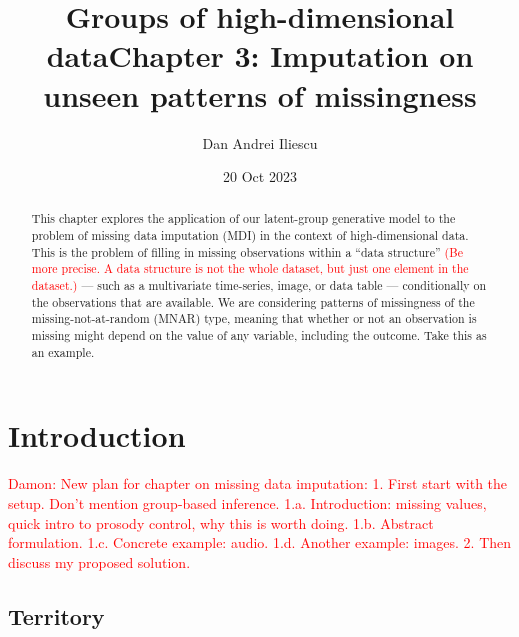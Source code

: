 \documentclass[a4paper,12pt,twoside,openright]{article}
\title{\bf Groups of high-dimensional data}
\author{Dan Andrei Iliescu}
\date{20 Oct 2023}
\title{Chapter 3: Imputation on unseen patterns of missingness}
\newcommand{\crit}[1]{\textcolor{red}{#1}}
\begin{document}
\allsectionsfont{\sffamily}




\maketitle

\tableofcontents

\begin{abstract}
    This chapter explores the application of our latent-group generative model to the problem of missing data imputation (MDI) in the context of high-dimensional data. This is the problem of filling in missing observations within a ``data structure'' \crit{(Be more precise. A data structure is not the whole dataset, but just one element in the dataset.)} --- such as a multivariate time-series, image, or data table --- conditionally on the observations that are available. We are considering patterns of missingness of the missing-not-at-random (MNAR) type, meaning that whether or not an observation is missing might depend on the value of any variable, including the outcome. Take this as an example.
\end{abstract}

\section{Introduction}

\crit{Damon: New plan for chapter on missing data imputation: 1. First start with the setup. Don't mention group-based inference. 1.a. Introduction: missing values, quick intro to prosody control, why this is worth doing. 1.b. Abstract formulation. 1.c. Concrete example: audio. 1.d. Another example: images. 2. Then discuss my proposed solution.}

\subsection{Territory}
\end{document}
